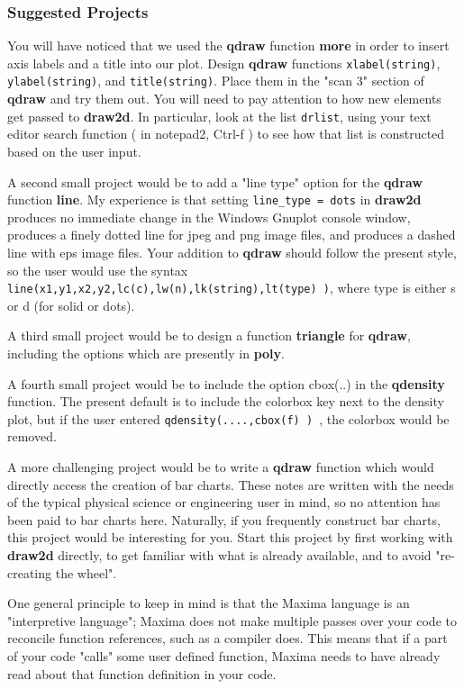 \documentclass[12pt]{article}
\begin{document}
\subsubsection{Suggested Projects}
You will have noticed that we used the \textbf{qdraw} function \textbf{more}
  in order to insert axis labels and a title into our plot.
Design  \textbf{qdraw} functions \verb|xlabel(string)|, \verb|ylabel(string)|,
  and \verb|title(string)|.
Place them in the "scan 3" section of \textbf{qdraw} and try them out.
You will need to pay attention to how new elements get passed to \textbf{draw2d}.
In particular, look at the list \verb|drlist|, using your text editor search
  function ( in notepad2, Ctrl-f ) to see how that list is constructed based
  on the user input.
  
  \smallskip
 A second small project would be to add a "line type" option for the
   \textbf{qdraw} function \textbf{line}. 
My experience is that setting \verb|line_type = dots| in \textbf{draw2d} produces
  no immediate change in the Windows Gnuplot console window, produces a finely
  dotted line for jpeg and png image files, and produces a dashed line with eps image files.
Your addition to \textbf{qdraw} should follow the present style, so the user
  would use the syntax \verb|line(x1,y1,x2,y2,lc(c),lw(n),lk(string),lt(type) )|,
  where type is either s or d (for solid or dots).
  
\smallskip
A third small project would be to design a function \textbf{triangle} for \textbf{qdraw},
  including the options which are presently in \textbf{poly}.


\smallskip
A fourth small project would be to include the option cbox(..) in the
  \textbf{qdensity} function. The present default is to include the
  colorbox key next to the density plot, but if the user entered
  \verb|qdensity(....,cbox(f) ) |, the colorbox would be removed.

\smallskip


A more challenging project would be to write a \textbf{qdraw} function
  which would directly access the creation of bar charts.
These notes are written with the needs of the typical physical science or
  engineering user in mind, so no attention has been paid to bar charts here.
Naturally, if you frequently construct bar charts, this project would be
  interesting for you.
Start this project by first working with \textbf{draw2d} directly, to get
  familiar with what is already available, and to avoid "re-creating the wheel".  

\smallskip
One general principle to keep in mind is that the Maxima language is an "interpretive
  language"; Maxima does not make multiple passes over your code to reconcile function
  references, such as a compiler does. 
This means that if a part of your code "calls" some user defined function, Maxima
  needs to have already read about that function definition in your code.
\end{document}
